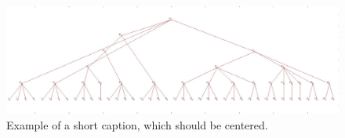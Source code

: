 \documentclass[10pt,twocolumn,letterpaper]{article}
\begin{document}
\begin{figure}
	\begin{center}
	    \includegraphics[width=1\linewidth]{carsDogs.png}
	\end{center}
	\caption{Example of a short caption, which should be centered.}
	\label{fig:short}
\end{figure}
{\small


}
\end{document}
